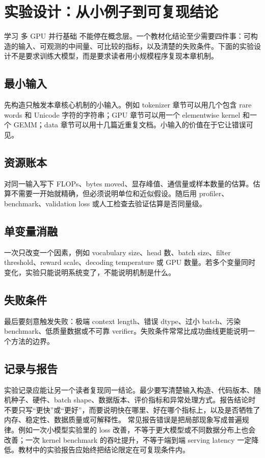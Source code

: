 \documentclass[a4paper]{article}
\begin{document}
\section{实验设计：从小例子到可复现结论}
学习 多 GPU 并行基础 不能停在概念层。一个教材化结论至少需要四件事：可构造的输入、可观测的中间量、可比较的指标，以及清楚的失败条件。下面的实验设计不是要求训练大模型，而是要求读者用小规模程序复现本章机制。
\subsection{最小输入}
先构造只触发本章核心机制的小输入。例如 tokenizer 章节可以用几个包含 rare words 和 Unicode 字符的字符串；GPU 章节可以用一个 elementwise kernel 和一个 GEMM；data 章节可以用十几篇近重复文档。小输入的价值在于它让错误可见。
\subsection{资源账本}
对同一输入写下 FLOPs、bytes moved、显存峰值、通信量或样本数量的估算。估算不需要一开始就精确，但必须说明单位和近似假设。随后用 profiler、benchmark、validation loss 或人工检查去验证估算是否同量级。
\subsection{单变量消融}
一次只改变一个因素，例如 vocabulary size、head 数、batch size、filter threshold、reward scale、decoding temperature 或 GPU 数量。若多个变量同时变化，实验只能说明系统变了，不能说明机制是什么。
\subsection{失败条件}
最后要刻意触发失败：极端 context length、错误 dtype、过小 batch、污染 benchmark、低质量数据或不可靠 verifier。失败条件常常比成功曲线更能说明一个方法的边界。
\subsection{记录与报告}
实验记录应能让另一个读者复现同一结论。最少要写清楚输入构造、代码版本、随机种子、硬件、batch shape、数据版本、评价指标和异常处理方式。报告结论时不要只写“更快”或“更好”，而要说明快在哪里、好在哪个指标上，以及是否牺牲了内存、稳定性、数据质量或可解释性。
常见报告错误是把局部现象写成普遍规律。例如一次小模型实验里的 loss 改善，不等于更大模型或不同数据分布上也会改善；一次 kernel benchmark 的吞吐提升，不等于端到端 serving latency 一定降低。教材中的实验报告应始终把结论限定在可复现条件内。
\end{document}
